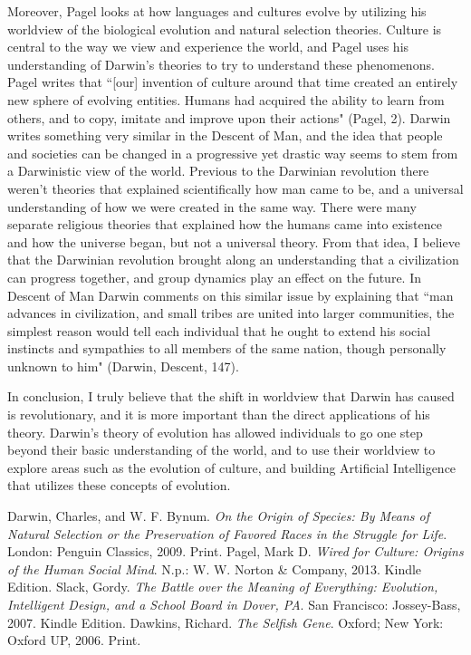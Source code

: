 \documentclass[11pt, oneside]{article}
\begin{document}
\par Moreover, Pagel looks at how languages and cultures evolve by utilizing his worldview of the biological evolution and natural selection theories. Culture is central to the way we view and experience the world, and Pagel uses his understanding of Darwin's theories to try to understand these phenomenons. Pagel writes that ``[our] invention of culture around that time created an entirely new sphere of evolving entities. Humans had acquired the ability to learn from others, and to copy, imitate and improve upon their actions" (Pagel, 2). Darwin writes something very similar in the Descent of Man, and the idea that people and societies can be changed in a progressive yet drastic way seems to stem from a Darwinistic view of the world. Previous to the Darwinian revolution there weren't theories that explained scientifically how man came to be, and a universal understanding of how we were created in the same way. There were many separate religious theories that explained how the humans came into existence and how the universe began, but not a universal theory. From that idea, I believe that the Darwinian revolution brought along an understanding that  a civilization can progress together, and group dynamics play an effect on the future. In Descent of Man Darwin comments on this similar issue by explaining that ``man advances in civilization, and small tribes are united into larger communities, the simplest reason would tell each individual that he ought to extend his social instincts and sympathies to all members of the same nation, though personally unknown to him" (Darwin, Descent, 147). 


\par In conclusion, I truly believe that the shift in worldview that Darwin has caused is revolutionary, and it is more important than the direct applications of his theory. Darwin's theory of evolution has allowed individuals to go one step beyond their basic understanding of the world, and to use their worldview to explore areas such as  the evolution of culture, and building Artificial Intelligence that utilizes these concepts of evolution. 


\begin{thebibliography}{9}
	Darwin, Charles, and W. F. Bynum.
	\emph{On the Origin of Species: By Means of Natural Selection or the Preservation of Favored Races in the Struggle for Life}.
	London: Penguin Classics, 2009.
	Print.
	Pagel, Mark D. 
	\emph{Wired for Culture: Origins of the Human Social Mind}. 
	N.p.: W. W. Norton \& Company, 2013. 
	Kindle Edition. 
	Slack, Gordy. 
	\emph{The Battle over the Meaning of Everything: Evolution, Intelligent Design, and a School Board in Dover, PA}.
	San Francisco: Jossey-Bass, 2007. 
	Kindle Edition.
	Dawkins, Richard. 
	\emph{The Selfish Gene}.
	Oxford; New York: Oxford UP, 2006. 
	Print.
\end{thebibliography}
\end{document}
